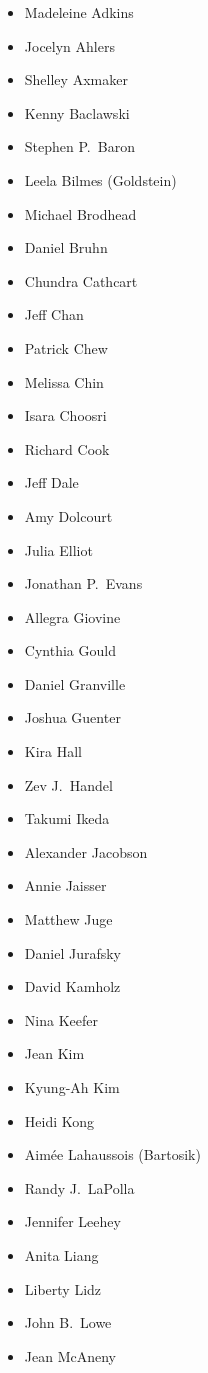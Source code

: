 \begin{multicols}{3}
\begin{itemize}
\item Madeleine Adkins
\item Jocelyn Ahlers
\item Shelley Axmaker
\item Kenny Baclawski
\item Stephen P.\ Baron
\item Leela Bilmes (Goldstein)
\item Michael Brodhead
\item Daniel Bruhn
\item Chundra Cathcart
\item Jeff Chan
\item Patrick Chew
\item Melissa Chin
\item Isara Choosri
\item Richard Cook
\item Jeff Dale
\item Amy Dolcourt
\item Julia Elliot
\item Jonathan P.\ Evans
\item Allegra Giovine
\item Cynthia Gould
\item Daniel Granville
\item Joshua Guenter
\item Kira Hall
\item Zev J.\ Handel
\item Takumi Ikeda
\item Alexander Jacobson
\item Annie Jaisser
\item Matthew Juge
\item Daniel Jurafsky
\item David Kamholz
\item Nina Keefer
\item Jean Kim
\item Kyung-Ah Kim
\item Heidi Kong
\item Aim\'ee Lahaussois (Bartosik)
\item Randy J.\ LaPolla
\item Jennifer Leehey
\item Anita Liang
\item Liberty Lidz
\item John B.\ Lowe
\item Jean McAneny

\end{itemize}
\end{multicols}

